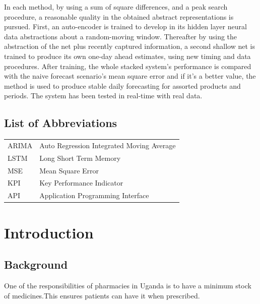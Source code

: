 \documentclass[12pt]{report}
\begin{document}
\indent In each method, by using a sum of square differences, and a peak search procedure, a reasonable quality in the obtained abstract representations is pursued. First, an auto-encoder is trained to develop in its hidden layer neural data abstractions about a random-moving window. Thereafter by using the abstraction of the net plus recently captured information, a second shallow net is trained to produce its own one-day ahead estimates, using new timing and data procedures. After training, the whole stacked system’s performance is compared with the naive forecast scenario’s mean square error and if it's a better value, the method is used to produce stable daily forecasting for assorted products and periods. The system has been tested in real-time with real data.

\newpage

\tableofcontents

\newpage

\listoffigures

\newpage

\listoftables

\newpage



\section*{List of Abbreviations}

\begin{tabular}{p{3cm} l}
	ARIMA	& Auto Regression Integrated Moving Average\\
	LSTM	& Long Short Term Memory\\	
  MSE & Mean Square Error\\
  KPI & Key Performance Indicator\\
  API & Application Programming Interface

\end{tabular}


\newpage

\chapter{Introduction}

\section{Background}
One of the responsibilities of pharmacies in  Uganda is to have a minimum stock of medicines.This ensures patients can have it when prescribed.
\end{document}
